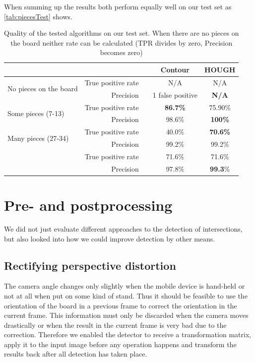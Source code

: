 	When summing up the results both perform equally well on our test set as \autoref{tab:piecesTest} shows.
	\begin{table}[b!]
		\centering
		\begin{tabular}{lr ccc}
		    \multicolumn{2}{c}{}											 		&\hphantom{Abst} & Contour 	& HOUGH\\
			\toprule
			\multirow{2}{*}{No pieces on the board}   		& True positive rate 	&& N/A 		& N/A  \\
															& Precision			 	&& 1 false positive 		& \bf{N/A} \\
			\midrule
			\multirow{2}{*}{Some pieces (7-13)}				& True positive rate 	&& \bf{86.7\%} 	& 75.90\% \\
															& Precision 			&& 98.6\% 		& \bf{100\%} \\
			\midrule
			\multirow{2}{*}{Many pieces (27-34)} 			& True positive rate 	&& 40.0\% 		& \bf{70.6\%} \\
															& Precision			 	&& 99.2\% 		& 99.2\% \\
			\specialrule{\heavyrulewidth}{\aboverulesep}{10pt}

			\multirow{2}{*}{Total}				 			& True positive rate 	&& 71.6\% 		& 71.6\% \\
															& Precision			 	&& 97.8\% 		& \textbf{99.3}\% \\
			\bottomrule
		\end{tabular}
		\caption{Quality of the tested algorithms on our test set. When there are no pieces on the board neither rate can be calculated (TPR divides by zero, Precision becomes zero)}
		\label{tab:piecesTest}
	\end{table}


	\section{Pre- and postprocessing}
	\label{evaluation-prepostprocessing}
	We did not just evaluate different approaches to the detection of intersections, but also looked into how we could improve detection by other means.

	\subsection{Rectifying perspective distortion}
	\label{evaluation-prepostprocessing-perspectiveRectifying}
	The camera angle changes only slightly when the mobile device is hand-held or not at all when put on some kind of stand. Thus it should be feasible to use the orientation of the board in a previous frame to correct the orientation in the current frame. This information must only be discarded when the camera moves drastically or when the result in the current frame is very bad due to the correction. Therefore we enabled the detector to receive a transformation matrix, apply it to the input image before any operation happens and transform the results back after all detection has taken place.

